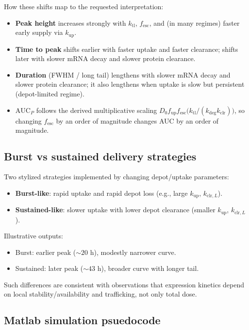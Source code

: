 How these shifts map to the requested interpretation:
\begin{itemize}
    \item \textbf{Peak height} increases strongly with $k_{\mathrm{tl}}$, $f_{\mathrm{esc}}$, and (in many regimes) faster early supply via $k_{\mathrm{up}}$.
    \item \textbf{Time to peak} shifts earlier with faster uptake and faster clearance; shifts later with slower mRNA decay and slower protein clearance.
    \item \textbf{Duration} (FWHM / long tail) lengthens with slower mRNA decay and slower protein clearance; it also lengthens when uptake is slow but persistent (depot-limited regime).
    \item $\mathrm{AUC}_P$ follows the derived multiplicative scaling $D_0f_{\mathrm{up}}f_{\mathrm{esc}}\bigl(k_{\mathrm{tl}}/(k_{\mathrm{deg}}k_{\mathrm{clr}})\bigr)$, so changing $f_{\mathrm{esc}}$ by an order of magnitude changes AUC by an order of magnitude.
\end{itemize}

\subsection*{Burst vs sustained delivery strategies}

Two stylized strategies implemented by changing depot/uptake parameters:
\begin{itemize}
    \item \textbf{Burst-like}: rapid uptake and rapid depot loss (e.g., large $k_{\mathrm{up}}$, $k_{\mathrm{clr},L}$).
    \item \textbf{Sustained-like}: slower uptake with lower depot clearance (smaller $k_{\mathrm{up}}$, $k_{\mathrm{clr},L}$).
\end{itemize}

Illustrative outputs:
\begin{itemize}
    \item Burst: earlier peak ($\sim 20$ h), modestly narrower curve.
    \item Sustained: later peak ($\sim 43$ h), broader curve with longer tail.
\end{itemize}

Such differences are consistent with observations that expression kinetics depend on local stability/availability and trafficking, not only total dose. \parencite{pardi2015expressionKinetics}

\subsection*{Matlab simulation psuedocode}
\inputminted[linenos, frame=single, breaklines, baselinestretch=1.2, fontsize=\small]{matlab}{sections/code.txt}